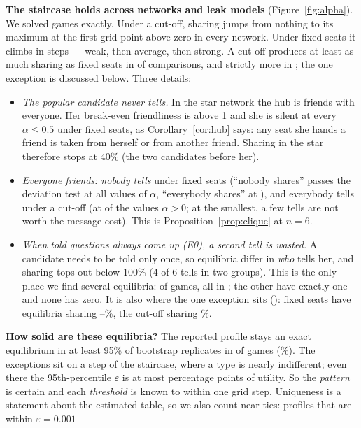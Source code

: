 \documentclass[10pt]{article}
\theoremstyle{plain}
\theoremstyle{definition}\newtheorem{definition}{Definition}
\newcommand{\finding}[1]{\textbf{#1}}
\begin{document}
\finding{The staircase holds across networks and leak models} (Figure~\ref{fig:alpha}). We solved \XoneCells{} games exactly. Under a cut-off, sharing jumps from nothing to its maximum at the first grid point
above zero in every network. Under fixed seats it climbs in steps --- weak, then average, then strong. A cut-off produces at least as much sharing as fixed seats in \HtwoOk{} of \HtwoCells{}
comparisons, and strictly more in \HtwoStrict; the one exception is discussed below. Three details:
\begin{itemize}
\item \emph{The popular candidate never tells.} In the star network the hub is friends with everyone. Her break-even friendliness is above 1 and she is silent at every $\alpha\le0.5$ under fixed seats, as
Corollary~\ref{cor:hub} says: any seat she hands a friend is taken from herself or from another friend. Sharing in the star therefore stops at 40\% (the two candidates before her).
\item \emph{Everyone friends: nobody tells} under fixed seats (``nobody shares'' passes the deviation test at all \CompGrid{} values of $\alpha$, ``everybody shares'' at \CompSeatsAllShare), and everybody tells under a cut-off
(at \CompBarAllShare{} of the \CompGridPos{} values $\alpha>0$; at the smallest, a few tells are not worth the message cost). This is Proposition~\ref{prop:clique} at $n=6$.
\item \emph{When told questions always come up (E0), a second tell is wasted.} A candidate needs to be told only once, so equilibria differ in \emph{who} tells her, and sharing tops out below 100\%
(4 of 6 tells in two groups). This is the only place we find several equilibria: \XoneMulti{} of \XoneCells{} games, all in \XoneMultiEnvs; the other \XoneUnique{} have exactly one and none has zero.
It is also where the one exception sits (\HtwoViolWhere): fixed seats have \HtwoViolSeatsN{} equilibria sharing \HtwoViolSeatsLo--\HtwoViolSeatsHi\%, the cut-off \HtwoViolBarN{} sharing \HtwoViolBar\%.
\end{itemize}
\finding{How solid are these equilibria?} The reported profile stays an exact equilibrium in at least 95\% of bootstrap replicates in \XoneBootOk{} of \XoneBootTot{} games (\XoneBootOkPct\%). The exceptions sit
on a step of the staircase, where a type is nearly indifferent; even there the 95th-percentile $\varepsilon$ is at most \XoneWorstEpsPP{} percentage points of utility. So the \emph{pattern} is certain and each \emph{threshold} is known to
within one grid step. Uniqueness is a statement about the estimated table, so we also count near-ties: profiles that are within $\varepsilon=0.001$
\end{document}
